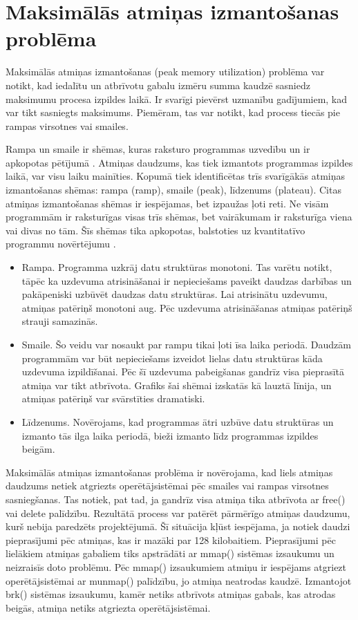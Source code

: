 \section{Maksimālās atmiņas izmantošanas problēma}
 \label{sec:peak_mem}
 Maksimālās atmiņas izmantošanas (peak memory utilization) problēma var notikt, kad iedalītu un atbrīvotu gabalu izmēru summa kaudzē sasniedz maksimumu procesa izpildes laikā.
Ir svarīgi pievērst uzmanību gadījumiem, kad var tikt sasniegts maksimums.
Piemēram, tas var notikt, kad process tiecās pie rampas virsotnes vai smailes.

Rampa un smaile ir shēmas, kuras raksturo programmas uzvedību un ir apkopotas pētījumā \cite{PWMS}. Atmiņas daudzums, kas tiek izmantots programmas izpildes laikā, var visu laiku mainīties.
Kopumā tiek identificētas trīs svarīgākās atmiņas izmantošanas shēmas: rampa (ramp),  smaile (peak),  līdzenums (plateau).
Citas atmiņas izmantošanas shēmas ir iespējamas, bet izpaužas ļoti reti.
Ne visām programmām ir raksturīgas visas trīs shēmas, bet vairākumam ir raksturīga viena vai divas no tām.
Šīs shēmas tika apkopotas, balstoties uz kvantitatīvo programmu novērtējumu \cite{PWMS}. 
\begin{itemize}
\item Rampa. Programma uzkrāj datu struktūras monotoni. 
Tas varētu notikt, tāpēc ka uzdevuma atrisināšanai ir nepieciešams paveikt daudzas darbības un pakāpeniski uzbūvēt daudzas  datu struktūras. 
Lai atrisinātu uzdevumu, atmiņas patēriņš monotoni aug. Pēc uzdevuma atrisināšanas atmiņas patēriņš strauji samazinās.
\item Smaile. Šo veidu var nosaukt par rampu tikai ļoti īsa laika periodā.
Daudzām programmām var būt nepieciešams izveidot lielas datu struktūras kāda uzdevuma izpildīšanai.
Pēc šī uzdevuma pabeigšanas gandrīz visa pieprasītā atmiņa var tikt atbrīvota.
Grafiks šai shēmai izskatās kā lauztā līnija, un atmiņas patēriņš var svārstīties dramatiski.
\item Līdzenums. Novērojams, kad programmas ātri uzbūve datu struktūras un izmanto tās ilga laika periodā, bieži izmanto līdz programmas izpildes beigām.
\end{itemize}


Maksimālās atmiņas izmantošanas problēma ir novērojama, kad liels atmiņas daudzums netiek atgriezts operētājsistēmai pēc smailes vai rampas virsotnes sasniegšanas.
Tas notiek, pat tad, ja gandrīz visa atmiņa tika atbrīvota ar free() vai delete palīdzību.
Rezultātā process var patērēt pārmērīgo atmiņas daudzumu, kurš nebija paredzēts projektējumā.
Šī situācija kļūst iespējama, ja notiek daudzi pieprasījumi pēc atmiņas, kas ir mazāki par 128 kilobaitiem.
Pieprasījumi pēc lielākiem atmiņas gabaliem tiks apstrādāti ar mmap() sistēmas izsaukumu un neizraisīs doto problēmu.
Pēc mmap() izsaukumiem atmiņu ir iespējams atgriezt operētājsistēmai ar munmap() palīdzību, jo atmiņa neatrodas kaudzē. 
Izmantojot brk() sistēmas izsaukumu, kamēr netiks atbrīvots atmiņas gabals, kas atrodas beigās, atmiņa netiks atgriezta operētājsistēmai.

